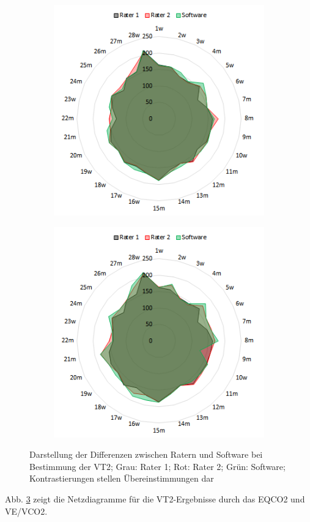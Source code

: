 \begin{figure}[H]
	\centering
	\begin{subfigure}[c]{0.45\textwidth}
		\centering
		\includegraphics[scale=0.7]{Bilder/eqco2_net}
		\label{subpic:pic3}
	\end{subfigure}%
	\hfil
	\begin{subfigure}[c]{0.45\textwidth}
		\centering
		\includegraphics[scale=0.7]{Bilder/ve_vco2_net}
		\label{subpic:pic4}
	\end{subfigure}
	\caption[Grafische Darstellung der Differenzen für die VT2]{Darstellung der Differenzen zwischen Ratern und Software bei Bestimmung der VT2; Grau: Rater 1; Rot: Rater 2; Grün: Software; Kontrastierungen stellen Übereinstimmungen dar}
	\label{pic:pic25}
\end{figure}
%
Abb. \ref{pic:pic25} zeigt die Netzdiagramme für die VT2-Ergebnisse durch das \acs{EQCO2} und \acs{VE}/\acs{VCO2}.

